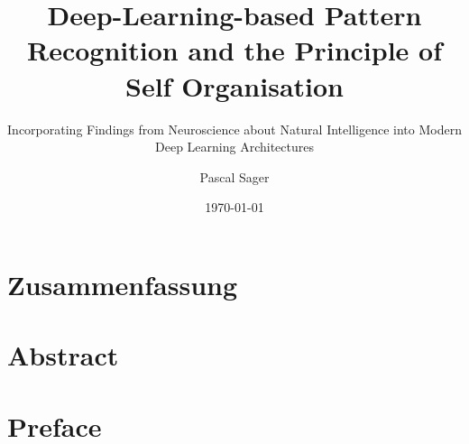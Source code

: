 \documentclass[
    fontsize=10pt,
    twoside=true,
    numbers=noenddot
]{cls/phdbyphd}
\theoremstyle{plain}
\begin{document}

\titlehead{Master of Science in Engineering with Specialisation in Data Science}

\subject{Master Thesis}
\title[Deep-Learning-based Pattern Recognition and the Principle of Self Organisation]{
    Deep-Learning-based Pattern Recognition and the Principle of Self Organisation
}
\subtitle{Incorporating Findings from Neuroscience about Natural Intelligence into Modern Deep Learning Architectures}

\author[Pascal Sager]{Pascal Sager}
\date{\today}

\publishers{Zurich University of Applied Sciences}

\frontmatter
{}


\maketitle


\setlength{\textheight}{23cm}

\chapter*{Zusammenfassung}
    
    
\chapter*{Abstract}
    

\chapter*{Preface}
    
\end{document}
